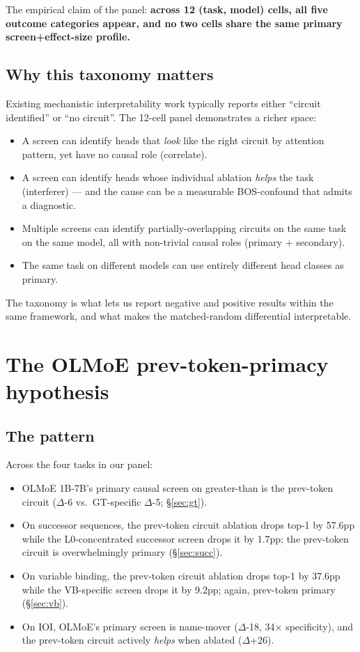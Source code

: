 \documentclass[11pt]{article}
\begin{document}
The empirical claim of the panel: \textbf{across 12 (task, model) cells, all five outcome categories appear, and no two cells share the same primary screen+effect-size profile.}

\subsection{Why this taxonomy matters}

Existing mechanistic interpretability work typically reports either ``circuit identified'' or ``no circuit''. The 12-cell panel demonstrates a richer space:
\begin{itemize}[topsep=2pt,itemsep=2pt]
\item A screen can identify heads that \emph{look} like the right circuit by attention pattern, yet have no causal role (correlate).
\item A screen can identify heads whose individual ablation \emph{helps} the task (interferer) --- and the cause can be a measurable BOS-confound that admits a diagnostic.
\item Multiple screens can identify partially-overlapping circuits on the same task on the same model, all with non-trivial causal roles (primary + secondary).
\item The same task on different models can use entirely different head classes as primary.
\end{itemize}
The taxonomy is what lets us report negative and positive results within the same framework, and what makes the matched-random differential interpretable.

\section{The OLMoE prev-token-primacy hypothesis}
\label{sec:olmoe-hypothesis}

\subsection{The pattern}

Across the four tasks in our panel:
\begin{itemize}[topsep=2pt,itemsep=2pt]
\item OLMoE 1B-7B's primary causal screen on greater-than is the prev-token circuit ($\Delta$-6 vs.\ GT-specific $\Delta$-5; \S\ref{sec:gt}).
\item On successor sequences, the prev-token circuit ablation drops top-1 by 57.6pp while the L0-concentrated successor screen drops it by 1.7pp; the prev-token circuit is overwhelmingly primary (\S\ref{sec:succ}).
\item On variable binding, the prev-token circuit ablation drops top-1 by 37.6pp while the VB-specific screen drops it by 9.2pp; again, prev-token primary (\S\ref{sec:vb}).
\item On IOI, OLMoE's primary screen is name-mover ($\Delta$-18, 34$\times$ specificity), and the prev-token circuit actively \emph{helps} when ablated ($\Delta$+26).
\end{itemize}
\end{document}
